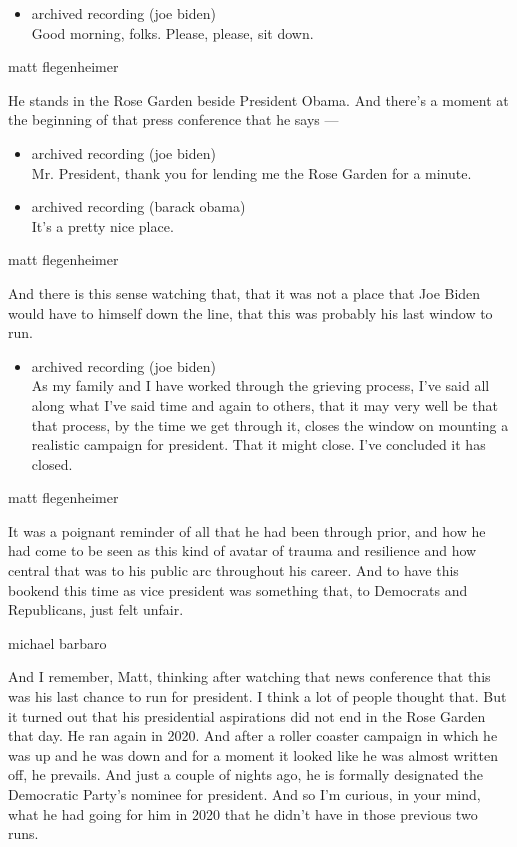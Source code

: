 \begin{itemize}
\tightlist
\item
  archived recording (joe biden)\\
  Good morning, folks. Please, please, sit down.
\end{itemize}

matt flegenheimer

He stands in the Rose Garden beside President Obama. And there's a
moment at the beginning of that press conference that he says ---

\begin{itemize}
\item
  archived recording (joe biden)\\
  Mr. President, thank you for lending me the Rose Garden for a minute.
\item
  archived recording (barack obama)\\
  It's a pretty nice place.
\end{itemize}

matt flegenheimer

And there is this sense watching that, that it was not a place that Joe
Biden would have to himself down the line, that this was probably his
last window to run.

\begin{itemize}
\tightlist
\item
  archived recording (joe biden)\\
  As my family and I have worked through the grieving process, I've said
  all along what I've said time and again to others, that it may very
  well be that that process, by the time we get through it, closes the
  window on mounting a realistic campaign for president. That it might
  close. I've concluded it has closed.
\end{itemize}

matt flegenheimer

It was a poignant reminder of all that he had been through prior, and
how he had come to be seen as this kind of avatar of trauma and
resilience and how central that was to his public arc throughout his
career. And to have this bookend this time as vice president was
something that, to Democrats and Republicans, just felt unfair.

michael barbaro

And I remember, Matt, thinking after watching that news conference that
this was his last chance to run for president. I think a lot of people
thought that. But it turned out that his presidential aspirations did
not end in the Rose Garden that day. He ran again in 2020. And after a
roller coaster campaign in which he was up and he was down and for a
moment it looked like he was almost written off, he prevails. And just a
couple of nights ago, he is formally designated the Democratic Party's
nominee for president. And so I'm curious, in your mind, what he had
going for him in 2020 that he didn't have in those previous two runs.

